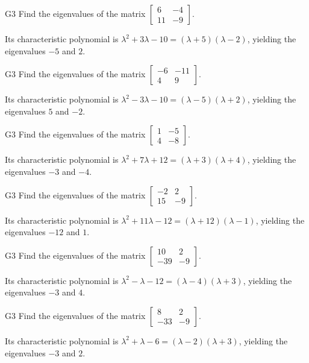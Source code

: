 \begin{problem}{G3}
Find the eigenvalues of the matrix \(\begin{bmatrix} 6 & -4 \\ 11 & -9\end{bmatrix}\).
\end{problem}
\begin{solution}
Its characteristic polynomial is \(\lambda^2+3\lambda-10=(\lambda+5)(\lambda-2)\), yielding the eigenvalues \(-5\) and \(2\).
\end{solution}

\begin{problem}{G3}
Find the eigenvalues of the matrix \(\begin{bmatrix} -6 & -11 \\ 4 & 9\end{bmatrix}\).
\end{problem}
\begin{solution}
Its characteristic polynomial is \(\lambda^2-3\lambda-10=(\lambda-5)(\lambda+2)\), yielding the eigenvalues \(5\) and \(-2\).
\end{solution}

\begin{problem}{G3}
Find the eigenvalues of the matrix \(\begin{bmatrix} 1 & -5 \\ 4 & -8\end{bmatrix}\).
\end{problem}
\begin{solution}
Its characteristic polynomial is \(\lambda^2+7\lambda+12=(\lambda+3)(\lambda+4)\), yielding the eigenvalues \(-3\) and \(-4\).
\end{solution}

\begin{problem}{G3}
Find the eigenvalues of the matrix \(\begin{bmatrix} -2 & 2 \\ 15 & -9\end{bmatrix}\).
\end{problem}
\begin{solution}
Its characteristic polynomial is \(\lambda^2+11\lambda-12=(\lambda+12)(\lambda-1)\), yielding the eigenvalues \(-12\) and \(1\).
\end{solution}


\begin{problem}{G3}
Find the eigenvalues of the matrix \(\begin{bmatrix} 10 & 2 \\ -39 & -9\end{bmatrix}\).
\end{problem}
\begin{solution}
Its characteristic polynomial is \(\lambda^2-\lambda-12=(\lambda-4)(\lambda+3)\), yielding the eigenvalues \(-3\) and \(4\).
\end{solution}

\begin{problem}{G3}
Find the eigenvalues of the matrix \(\begin{bmatrix} 8 & 2 \\ -33 & -9\end{bmatrix}\).
\end{problem}
\begin{solution}
Its characteristic polynomial is \(\lambda^2+\lambda-6=(\lambda-2)(\lambda+3)\), yielding the eigenvalues \(-3\) and \(2\).
\end{solution}

